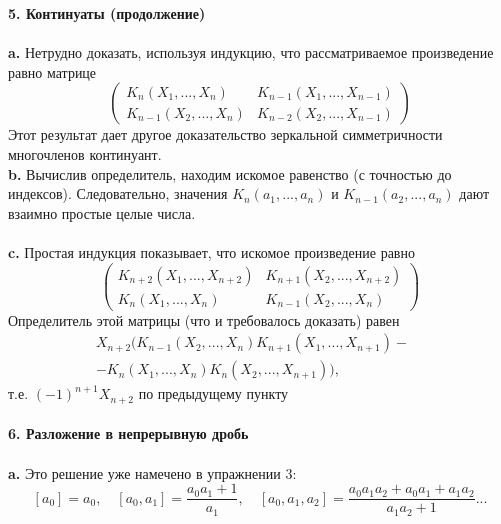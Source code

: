\documentclass{mai_book}
\begin{document}
\noindent\textbf{5. Континуаты (продолжение)}\\
\\
\hspace*{15pt}\textbf{a.} Нетрудно доказать, используя индукцию, что рассматриваемое\linebreak
произведение равно матрице
$$\begin{pmatrix}
	K_n(X_1,...,X_n)& K_{n-	1}(X_1,...,X_{n-1})\\
	K_{n-1}(X_2,...,X_n)& K_{n-2}(X_2,...,X_{n-1})
\end{pmatrix}$$
\noindent Этот результат дает другое доказательство зеркальной симметричности\linebreak
многочленов континуант.\newline
\\
\hspace*{15pt}\textbf{b.} Вычислив определитель, находим искомое равенство (с точно­стью\linebreak
до индексов). Следовательно, значения $K_n(a_1,...,a_n)$ и\linebreak
$K_{n-1}(a_2,...,a_n)$ дают взаимно простые целые числа.\\
\\
\hspace*{15pt}\textbf{c.} Простая индукция показывает, что искомое произведение равно
$$\begin{pmatrix}
	K_{n+2}(X_1,...,X_{n+2})& K_{n+1}(X_2,...,X_{n+2})\\
	K_n(X_1,...,X_n)& K_{n-1}(X_2,...,X_n)
\end{pmatrix}$$
\noindent Определитель этой матрицы (что и требовалось доказать) равен
\begin{eqnarray*}
	X_{n+2}\Big( K_{n-1}(X_2,...,X_n) K_{n+1}(X_1,...,X_{n+1})-\quad\\
	-K_n(X_1,...,X_n)K_n(X_2,...,X_{n+1}) \Big),
\end{eqnarray*}
т.е.\:\: $(-1)^{n+1}X_{n+2}$\:\: по предыдущему пункту\\
\\

\noindent\textbf{6. Разложение в непрерывную дробь}\\
\\
\hspace*{15pt}\textbf{a.} Это решение уже намечено в упражнении 3:
$$[a_0]=a_0,\quad [a_0,a_1]=\frac{a_0a_1+1}{a_1},\quad [a_0,a_1,a_2]=\frac{a_0a_1a_2+a_0a_1+a_1a_2}{a_1a_2+1}...$$
\newpage
\end{document}
